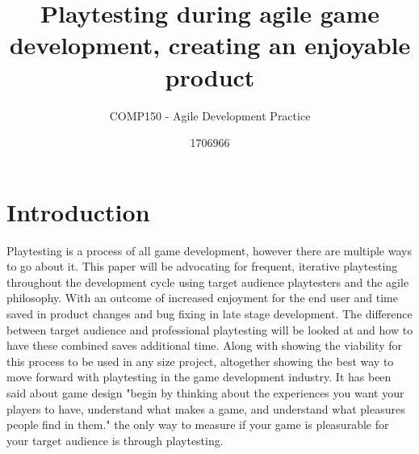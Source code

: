 \documentclass{scrartcl}
\title{Playtesting during agile game development, creating an enjoyable product}
\subtitle{COMP150 - Agile Development Practice}
\author{1706966}
\begin{document}
\maketitle


\section{Introduction}

Playtesting is a process of all game development, however there are multiple ways to go about it. This paper will be advocating for frequent, iterative playtesting throughout the development cycle using target audience playtesters and the agile philosophy\cite{fowler2001agile}. With an outcome of increased enjoyment for the end user and time saved in product changes and bug fixing in late stage development. The difference between target audience and professional playtesting will be looked at and how to have these combined saves additional time. Along with showing the viability for this process to be used in any size project, altogether showing the best way to move forward with playtesting in the game development industry. It has been said about game design "begin by thinking about the experiences you want your players to have, understand what makes a game, and understand what pleasures people find in them."\cite{costikyan2005have} the only way to measure if your game is pleasurable for your target audience is through playtesting.
\end{document}
